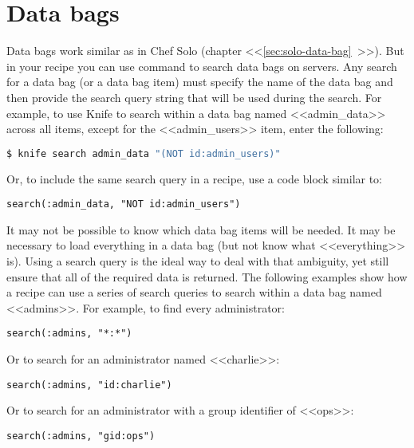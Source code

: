 \section{Data bags}
\label{sec:server-data-bags}

Data bags work similar as in Chef Solo (chapter <<\ref{sec:solo-data-bag}~>>). But in your recipe you can use  command to search data bags on servers. Any search for a data bag (or a data bag item) must specify the name of the data bag and then provide the search query string that will be used during the search. For example, to use Knife to search within a data bag named <<admin\_data>> across all items, except for the <<admin\_users>> item, enter the following:

\begin{lstlisting}[language=Bash,label=lst:my-server-cloud-databag1]
$ knife search admin_data "(NOT id:admin_users)"
\end{lstlisting}

Or, to include the same search query in a recipe, use a code block similar to:

\begin{lstlisting}[label=lst:my-server-cloud-databag2]
search(:admin_data, "NOT id:admin_users")
\end{lstlisting}

It may not be possible to know which data bag items will be needed. It may be necessary to load everything in a data bag (but not know what <<everything>> is). Using a search query is the ideal way to deal with that ambiguity, yet still ensure that all of the required data is returned. The following examples show how a recipe can use a series of search queries to search within a data bag named <<admins>>. For example, to find every administrator:

\begin{lstlisting}[label=lst:my-server-cloud-databag3]
search(:admins, "*:*")
\end{lstlisting}

Or to search for an administrator named <<charlie>>:

\begin{lstlisting}[label=lst:my-server-cloud-databag4]
search(:admins, "id:charlie")
\end{lstlisting}

Or to search for an administrator with a group identifier of <<ops>>:

\begin{lstlisting}[label=lst:my-server-cloud-databag5]
search(:admins, "gid:ops")
\end{lstlisting}

